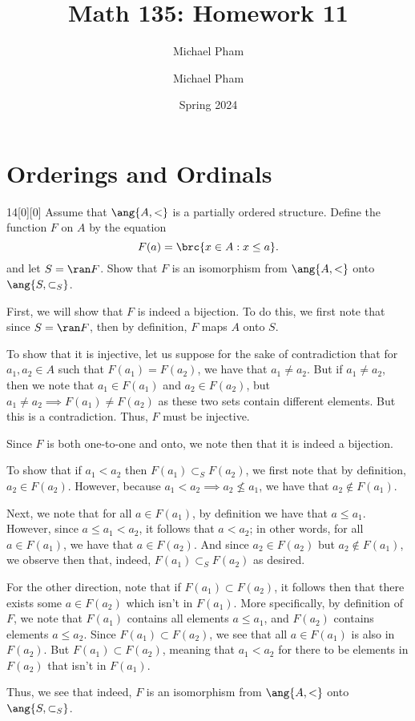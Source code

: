 \documentclass{article}
\title{#1}
\author{Michael Pham}
\date{#2}
\renewcommand{\mytitle}[2]{%
	\title{#1}
	\author{Michael Pham}
	\date{#2}
	\maketitle
	\newpage
	\listoftheorems
	\newpage
}
\begin{document}
\mytitle{Math 135: Homework 11}{Spring 2024}

\setcounter{section}{6}
\section{Orderings and Ordinals}

\begin{hw}{14}[0][0]
	Assume that $\ang{A, <}$ is a partially ordered structure. Define the function $F$ on $A$ by the equation
	\begin{equation*}
		F(a) = \brc{x \in A : x \leq a}.
	\end{equation*}
	and let $S = \ran F$. Show that $F$ is an isomorphism from $\ang{A, <}$ onto $\ang{S, \subset_S}$.
\end{hw}
\begin{solution}
	First, we will show that $F$ is indeed a bijection. To do this, we first note that since $S = \ran F$, then by definition, $F$ maps $A$ onto $S$.
	
	To show that it is injective, let us suppose for the sake of contradiction that for $a_1, a_2 \in A$ such that $F(a_1) = F(a_2)$, we have that $a_1 \neq a_2$. But if $a_1 \neq a_2$, then we note that $a_1 \in F(a_1)$ and $a_2 \in F(a_2)$, but $a_1 \neq a_2 \implies F(a_1) \neq F(a_2)$ as these two sets contain different elements. But this is a contradiction. Thus, $F$ must be injective.
	
	Since $F$ is both one-to-one and onto, we note then that it is indeed a bijection.
	
	To show that if $a_1 < a_2$ then $F(a_1) \subset_S F(a_2)$, we first note that by definition, $a_2 \in F(a_2)$. However, because $a_1 < a_2 \implies a_2 \not\leq a_1$, we have that $a_2 \not\in F(a_1)$.
	
	Next, we note that for all $a \in F(a_1)$, by definition we have that $a \leq a_1$. However, since $a \leq a_1 < a_2$, it follows that $a < a_2$; in other words, for all $a \in F(a_1)$, we have that $a \in F(a_2)$. And since $a_2 \in F(a_2)$ but $a_2 \not\in F(a_1)$, we observe then that, indeed, $F(a_1) \subset_S F(a_2)$ as desired.
	
	For the other direction, note that if $F(a_1) \subset F(a_2)$, it follows then that there exists some $a \in F(a_2)$ which isn't in $F(a_1)$. More specifically, by definition of $F$, we note that $F(a_1)$ contains all elements $a \leq a_1$, and $F(a_2)$ contains elements $a \leq a_2$. Since $F(a_1) \subset F(a_2)$, we see that all $a \in F(a_1)$ is also in $F(a_2)$. But $F(a_1) \subset F(a_2)$, meaning that $a_1 < a_2$ for there to be elements in $F(a_2)$ that isn't in $F(a_1)$.
	
	Thus, we see that indeed, $F$ is an isomorphism from $\ang{A, <}$ onto $\ang{S, \subset_S}$.
\end{solution}
\end{document}
